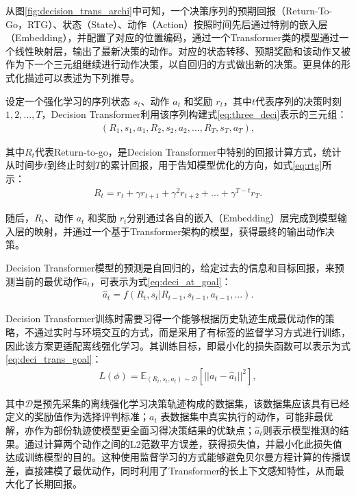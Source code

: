 从图\ref{fig:decision_trans_archi}中可知，一个决策序列的预期回报（Return-To-Go，RTG）、状态（State）、动作（Action）按照时间先后通过特别的嵌入层（Embedding），并配置了对应的位置编码，通过一个Transformer类的模型通过一个线性映射层，输出了最新决策的动作。对应的状态转移、预期奖励和该动作又被作为下一个三元组继续进行动作决策，以自回归的方式做出新的决策。更具体的形式化描述可以表述为下列推导。

设定一个强化学习的序列状态 $s_t$、动作 $a_t$ 和奖励 $r_t$，其中$t$代表序列的决策时刻$1,2,...,T$，Decision Transformer利用该序列构建式\eqref{eq:three_deci}表示的三元组：
\begin{equation}
\begin{aligned}
    (R_1,s_1,a_1,R_2,s_2,a_2,...,R_T,s_T,a_T),
\end{aligned}
\label{eq:three_deci}
\end{equation} 

其中$R_t$代表Return-to-go，是Decision Transformer中特别的回报计算方式，统计从时间步$t$到终止时刻$T$的累计回报，用于告知模型优化的方向，如式\eqref{eq:rtg}所示：
\begin{equation}
\begin{aligned}
    R_t = r_t + \gamma r_{t+1} + \gamma^2 r_{t+2} + ... + \gamma ^{T-t}r_{T}.
\end{aligned}
\label{eq:rtg}
\end{equation} 

随后，$R_t$、动作 $a_t$ 和奖励 $r_t$分别通过各自的嵌入（Embedding）层完成到模型输入层的映射，并通过一个基于Transformer架构的模型，获得最终的输出动作决策。

Decision Transformer模型的预测是自回归的，给定过去的信息和目标回报，来预测当前的最优动作$\hat{a}_t$，可表示为式\eqref{eq:deci_at_goal}：
\begin{equation}
\begin{aligned}
    \hat{a}_t = f(R_t,s_t|R_{t-1},s_{t-1},a_{t-1},...).
\end{aligned}
\label{eq:deci_at_goal}
\end{equation} 


Decision Transformer训练时需要习得一个能够根据历史轨迹生成最优动作的策略，不通过实时与环境交互的方式，而是采用了有标签的监督学习方式进行训练，因此该方案更适配离线强化学习。其训练目标，即最小化的损失函数可以表示为式\eqref{eq:deci_trans_goal}：
\begin{equation}
\begin{aligned}
    L(\phi) = \mathbb{E}_{(R_t,s_t,a_t) \sim \mathcal{D}}\left[||a_t-\hat{a}_t||^2\right],
\end{aligned}
\label{eq:deci_trans_goal}
\end{equation}

其中$\mathcal{D}$是预先采集的离线强化学习决策轨迹构成的数据集，该数据集应该具有已经定义的奖励值作为选择评判标准；$a_t$ 表数据集中真实执行的动作，可能非最优解，亦作为部份轨迹使模型更全面习得决策结果的优缺点；$\hat{a}_t$则表示模型推测的结果。通过计算两个动作之间的L2范数平方误差，获得损失值，并最小化此损失值达成训练模型的目的。这种使用监督学习的方式能够避免贝尔曼方程计算的传播误差，直接建模了最优动作，同时利用了Transformer的长上下文感知特性，从而最大化了长期回报。

